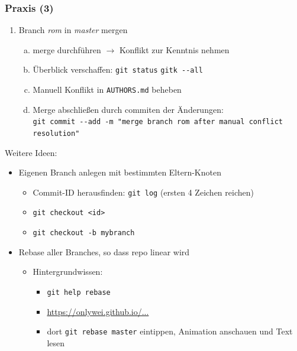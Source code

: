 \documentclass{beamer}
\begin{document}
\begin{frame}[fragile,label=uebung40]
\frametitle{Praxis (3)}
\begin{enumerate}
 \setcounter{enumi}{\value{taskcounter}}
 \item Branch \textit{rom} in \textit{master} mergen
 \begin{enumerate}[a)]
 \item merge durchführen $\rightarrow$ Konflikt zur Kenntnis nehmen
 \item Überblick verschaffen: \verb|git status|  \verb|gitk --all|
 \item Manuell Konflikt in \verb|AUTHORS.md| beheben
 \item Merge abschließen durch commiten der Änderungen:\\
 {\tiny \verb|git commit --add -m "merge branch rom after manual conflict resolution"|}
 \end{enumerate}

 \setcounter{taskcounter}{\value{enumi}}
\end{enumerate}

Weitere Ideen:
\begin{itemize}
 \item Eigenen Branch anlegen mit bestimmten Eltern-Knoten
 \begin{itemize}
  \item Commit-ID herausfinden: \verb|git log| (ersten 4 Zeichen reichen)
  \item \verb|git checkout <id>|
  \item \verb|git checkout -b mybranch|
 \end{itemize}
 \item Rebase aller Branches, so dass repo linear wird
 \begin{itemize}
  \item Hintergrundwissen:
  \begin{itemize}
   \item  \verb|git help rebase|

\item \href{https://onlywei.github.io/explain-git-with-d3/#rebase}{https://onlywei.github.io/...}
  \item dort \verb|git rebase master| eintippen, Animation anschauen und Text lesen
  \end{itemize}
 \end{itemize}

\end{itemize}

\end{frame}
\end{document}
